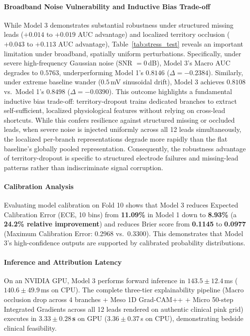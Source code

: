 \documentclass[12pt]{elsarticle}
\begin{document}
\paragraph{Broadband Noise Vulnerability and Inductive Bias Trade-off}
While Model 3 demonstrates substantial robustness under structured missing leads ($+0.014$ to $+0.019$ AUC advantage) and localized territory occlusion ($+0.043$ to $+0.113$ AUC advantage), Table~\ref{tab:stress_test} reveals an important limitation under broadband, spatially uniform perturbations. Specifically, under severe high-frequency Gaussian noise (SNR $= 0$\,dB), Model 3's Macro AUC degrades to $0.5763$, underperforming Model 1's $0.8146$ ($\Delta = -0.2384$). Similarly, under extreme baseline wander ($0.5$\,mV sinusoidal drift), Model 3 achieves $0.8108$ vs.\ Model 1's $0.8498$ ($\Delta = -0.0390$). This outcome highlights a fundamental inductive bias trade-off: territory-dropout trains dedicated branches to extract self-sufficient, localized physiological features without relying on cross-lead shortcuts. While this confers resilience against structured missing or occluded leads, when severe noise is injected uniformly across all 12 leads simultaneously, the localized per-branch representations degrade more rapidly than the flat baseline's globally pooled representation. Consequently, the robustness advantage of territory-dropout is specific to structured electrode failures and missing-lead patterns rather than indiscriminate signal corruption.

\paragraph{Calibration Analysis}
Evaluating model calibration on Fold 10 shows that Model 3 reduces Expected Calibration Error (ECE, 10 bins) from \textbf{11.09\%} in Model 1 down to \textbf{8.93\%} (a \textbf{24.2\% relative improvement}) and reduces Brier score from \textbf{0.1145} to \textbf{0.0977} (Maximum Calibration Error: 0.2968 vs.\ 0.3300). This demonstrates that Model 3's high-confidence outputs are supported by calibrated probability distributions.

\paragraph{Inference and Attribution Latency}
On an NVIDIA GPU, Model 3 performs forward inference in $143.5 \pm 12.4$\,ms ($140.6 \pm 49.9$\,ms on CPU). The complete three-tier explainability pipeline (Macro occlusion drop across 4 branches + Meso 1D Grad-CAM++ + Micro 50-step Integrated Gradients across all 12 leads rendered on authentic clinical pink grid) executes in \textbf{$3.33 \pm 0.28$\,s} on GPU ($3.36 \pm 0.37$\,s on CPU), demonstrating bedside clinical feasibility.
\end{document}
